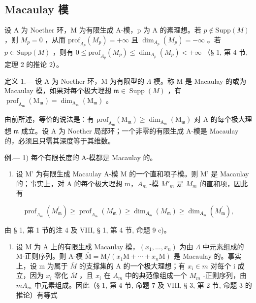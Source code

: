 \subsection{Macaulay 模}

设 A 为 Noether 环，M 为有限生成 A-模，p 为 A 的素理想。若 \(p \notin \text{Supp}(M)\) ，则 \(M_{p} = 0\) ，从而 \(\text{prof}_{A_{p}}(M_{p}) = +\infty\) 且 \(\dim_{A_{p}}(M_{p}) = -\infty\) 。若 \(p \in \text{Supp}(M)\) ，则有 \(0 \leqslant \text{prof}_{A_{p}}(M_{p}) \leqslant \dim_{A_{p}}(M_{p}) < +\infty\) （§ 1, 第 4 节, 定理 2 的推论 2）。

定义 1.--- 设 A 为 Noether 环，M 为有限型的 \(\Lambda\) 模。称 M 是 Macaulay 的或为 Macaulay 模，如果对每个极大理想 \(\mathfrak{m} \in \operatorname{Supp}(M)\) ，有 \(\operatorname{prof}_{\mathrm{A}_{\mathfrak{m}}}\left(\mathrm{M}_{\mathfrak{m}}\right) = \dim_{\mathrm{A}_{\mathfrak{m}}}\left(\mathrm{M}_{\mathfrak{m}}\right)\) 。

由前所述，等价的说法是：有 \(\mathrm{prof}_{\mathrm{A}_{\mathfrak{m}}}\left(\mathrm{M}_{\mathfrak{m}}\right) \geqslant \dim_{\mathrm{A}_{\mathfrak{m}}}\left(\mathrm{M}_{\mathfrak{m}}\right)\) 对 A 的每个极大理想 \(\mathfrak{m}\) 成立。设 A 为 Noether 局部环；一个非零的有限生成 A-模是 Macaulay 的，必须且只需其深度等于其维数。

例.--- 1) 每个有限长度的 A-模都是 Macaulay 的。

\begin{enumerate}
\def\labelenumi{\arabic{enumi})}
\setcounter{enumi}{1}
\tightlist
\item
  设 M' 为有限生成 Macaulay A-模 M 的一个直和项子模。则 M' 是 Macaulay 的；事实上，对 A 的每个极大理想 m，\(A_{m}\) -模 \(M'_{m}\) 是 \(M_{m}\) 的直和项，因此有
\end{enumerate}

\[
\operatorname{prof} _ {A _ {\mathfrak {m}}} \left(M _ {\mathfrak {m}} ^ {\prime}\right) \geqslant \operatorname{prof} _ {A _ {\mathfrak {m}}} \left(M _ {\mathfrak {m}}\right) \geqslant \dim_ {A _ {\mathfrak {m}}} \left(M _ {\mathfrak {m}}\right) \geqslant \dim_ {A _ {\mathfrak {m}}} \left(M _ {\mathfrak {m}} ^ {\prime}\right),
\]

由 § 1, 第 1 节的注 4 及 VIII, § 1, 第 4 节, 命题 9 c)。

\begin{enumerate}
\def\labelenumi{\arabic{enumi})}
\setcounter{enumi}{2}
\tightlist
\item
  设 M 为 A 上的有限生成 Macaulay 模，\((x_{1},\ldots,x_{n})\) 为由 \(\Lambda\) 中元素组成的 M-正则序列。则 A-模 \(\overline{\mathrm{M}}=\mathrm{M}/(x_{1}\mathrm{M}+\cdots+x_{n}\mathrm{M})\) 是 Macaulay 的。事实上，设 m 为属于 \(\overline{M}\) 的支撑集的 A 的一个极大理想；有 \(x_{i}\in m\) 对每个 i 成立，因为 \(x_{i}\) 零化 \(\overline{M}\) ，且 \(x_{i}\) 在 \(A_{m}\) 中的典范像组成一个 \(M_{m}\) -正则序列，由 \(mA_{m}\) 中元素组成。因此（§ 1, 第 4 节, 命题 7 及 VIII, § 3, 第 2 节, 命题 3 的推论）有等式
\end{enumerate}

